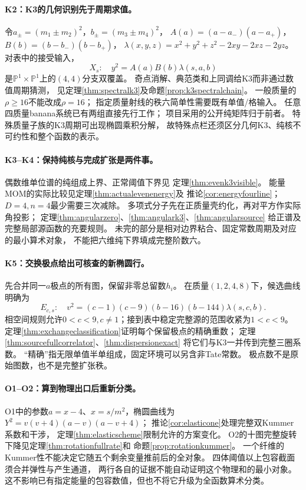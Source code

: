 \documentclass[11pt,a4paper]{ctexart}
\theoremstyle{cnplain}\newtheorem{theorem}{定理}[section]
\theoremstyle{definition}\newtheorem{definition}[theorem]{定义}
\theoremstyle{remark}\newtheorem{remark}[theorem]{注}
\begin{document}
\paragraph{K2：K3的几何识别先于周期求值。}
令$a_\pm=(m_1\pm m_2)^2$，$b_\pm=(m_3\pm m_4)^2$，
$A(a)=(a-a_-)(a-a_+)$，$B(b)=(b-b_-)(b-b_+)$，
$\lambda(x,y,z)=x^2+y^2+z^2-2xy-2xz-2yz$。
对表中的接受输入，
\[
 X_s:\quad y^2=A(a)B(b)\lambda(s,a,b)
\]
是$\mathbb P^1\times\mathbb P^1$上的$(4,4)$分支双覆盖。
奇点消解、典范类和上同调给K3而非通过数值周期猜测，
见定理\ref{thm:spectralk3}及命题\ref{prop:k3spectralchain}。
一般质量的$\rho\ge16$不能改成$\rho=16$；
指定质量射线的秩六简单性需要既有单值/格输入。
任意四质量banana系统已有两组直接先行工作\cite{LitDMPS,LitPTWW}；
项目采用的公开纯矩阵归于前者。
特殊质量子族的K3周期可出现椭圆乘积分解\cite{LitDM,LitDMfull}，
故特殊点栏还须区分几何K3、纯核不可约性和整个函数的表示。

\paragraph{K3--K4：保持纯核与完成扩张是两件事。}
偶数维单位谱的纯组成上界、正常阈值下界见
定理\ref{thm:evenk3visible}。
能量MOM的实际比较见定理\ref{thm:actualevenenergy}及
推论\ref{cor:energyfourline}；$D=4,n=4$最少需要三次减除。
多项式分子先在正质量壳约化，再对平方作实际角投影；
定理\ref{thm:angularzero}、\ref{thm:angulark3}、\ref{thm:angularsource}
给正谱及完整局部源函数的充要规则。
未完的部分是相对边界粘合、固定常数周期及对应的最小算术对象，
不能把六维纯下界填成完整阶数六。

\paragraph{K5：交换极点给出可核查的新椭圆行。}
先合并同一$a$极点的所有图，保留非零总留数$h_i$。
在质量$(1,2,4,8)$下，候选曲线明确为
\[
 E_{c,s}:\quad v^2=(c-1)(c-9)(b-16)(b-144)\lambda(s,c,b).
\]
相空间规则允许$0<c<9,c\ne1$；接到表中稳定完整源的范围收紧为$1<c<9$。
定理\ref{thm:exchangeclassification}证明每个保留极点的精确重数；
定理\ref{thm:sourcefullcorrelator}、\ref{thm:dispersionexact}
将它们与K3一并传到完整三圈系数。
“精确”指无限单值半单组成，固定环境可以另含非Tate常数。
极点数不是原始图数，也不是完整扩张秩。

\paragraph{O1--O2：算到物理出口后重新分类。}
O1中的参数$a=x-4$、$x=s/m^2$，椭圆曲线为
$Y^2=v(v+4)(a-v)(a-v+4)$；
推论\ref{cor:elasticone}处理完整双Kummer系数和干涉，
定理\ref{thm:elasticscheme}限制允许的方案变化。
O2的十图完整旋转下降见定理\ref{thm:rotationfullrate}和
命题\ref{prop:rotationkummer}。
一个纤维的Kummer性不能决定它随五个剩余变量推前后的全对象。
四体阈值以上包容截面须合并弹性与产生通道，
两行各自的证据不能自动证明这个物理和的最小对象。
这不影响已有指定能量的包容数值，但也不将它升级为全函数算术分类。
\end{document}
